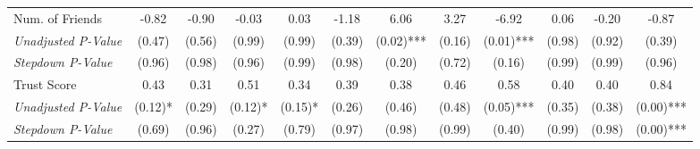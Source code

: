 \begin{tabular}{l c c c c c c c c c c c}
Num. of Friends & -0.82 & -0.90 & -0.03 & 0.03 & -1.18 & 6.06 & 3.27 & -6.92 & 0.06 & -0.20 & -0.87 \\
\quad \textit{Unadjusted P-Value} & (0.47) & (0.56) & (0.99) & (0.99) & (0.39) & (0.02)*** & (0.16) & (0.01)*** & (0.98) & (0.92) & (0.39) \\
\quad \textit{Stepdown P-Value} & (0.96) & (0.98) & (0.96) & (0.99) & (0.98) & (0.20) & (0.72) & (0.16) & (0.99) & (0.99) & (0.96) \\
Trust Score & 0.43 & 0.31 & 0.51 & 0.34 & 0.39 & 0.38 & 0.46 & 0.58 & 0.40 & 0.40 & 0.84 \\
\quad \textit{Unadjusted P-Value} & (0.12)* & (0.29) & (0.12)* & (0.15)* & (0.26) & (0.46) & (0.48) & (0.05)*** & (0.35) & (0.38) & (0.00)*** \\
\quad \textit{Stepdown P-Value} & (0.69) & (0.96) & (0.27) & (0.79) & (0.97) & (0.98) & (0.99) & (0.40) & (0.99) & (0.98) & (0.00)*** \\
\bottomrule
\end{tabular}
